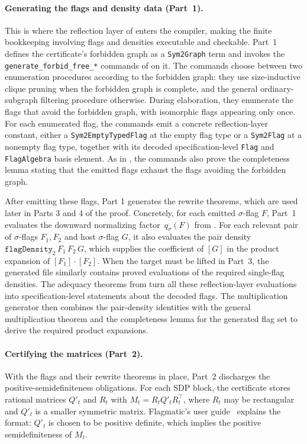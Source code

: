 \documentclass{article}
\newcommand{\lean}[1]{\texttt{#1}}
\begin{document}
\paragraph{Generating the flags and density data (Part~1).}
This is where the reflection layer of  enters the
compiler, making the finite bookkeeping involving flags and densities
executable and checkable.  Part~1 defines the certificate's forbidden graph as a
\lean{Sym2Graph} term and invokes the \lean{generate\_forbid\_free\_*}
commands of  on it.  The commands choose
between two enumeration procedures according to the forbidden graph: they use
size-inductive clique pruning when the forbidden graph is complete, and the
general ordinary-subgraph filtering procedure otherwise.  During elaboration,
they enumerate the flags that avoid the forbidden graph, with isomorphic
flags appearing only once.  For each enumerated flag, the commands emit a concrete
reflection-layer constant, either a \lean{Sym2EmptyTypedFlag} at the empty flag type
or a \lean{Sym2Flag} at a nonempty flag type, together with its decoded
specification-level \lean{Flag} and \lean{FlagAlgebra} basis element.  As in
, the commands also prove the completeness
lemma stating that the emitted flags exhaust the flags avoiding the forbidden
graph.

After emitting these flags, Part 1 generates
the rewrite theorems, which are used later
in Parts 3 and 4 of the proof.  Concretely, for each emitted $\sigma$-flag
$F$, Part~1 evaluates the downward normalizing
factor~$q_\sigma(F)$ from .
For each relevant pair of $\sigma$-flags $F_1,F_2$ and host $\sigma$-flag $G$, it also
evaluates the pair density
\(\lean{flagDensity}_2\,F_1\,F_2\,G\), which supplies the coefficient of $[G]$
in the product expansion of $[F_1]\cdot[F_2]$.  When the target must be
lifted in Part~3, the generated file similarly contains proved evaluations of
the required single-flag densities.  The adequacy theorems from
 turn all these reflection-layer evaluations into
specification-level statements about the decoded flags.  The multiplication
generator then combines the pair-density identities with the general
multiplication theorem and the completeness lemma for the generated flag set
to derive the required product expansions.

\paragraph{Certifying the matrices (Part~2).}
With the flags and their rewrite theorems in place, Part~2 discharges the
positive-semidefiniteness obligations.  For each SDP block, the certificate
stores rational matrices $Q'_t$ and $R_t$ with
$M_t=R_tQ'_tR_t^\top$, where $R_t$ may be rectangular and $Q'_t$ is a smaller
symmetric matrix. Flagmatic's user guide~\cite{vaughan2012flagmaticguide}
explains the format: $Q'_t$ is
chosen to be positive definite, which implies the positive semidefiniteness of $M_t$.
\end{document}
